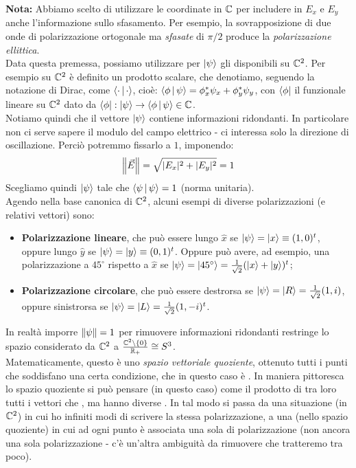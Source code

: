 \documentclass[FisicaTeorica.tex]{subfiles}
\begin{document}
\textbf{Nota:} Abbiamo scelto di utilizzare le coordinate in $\mathbb{C}$ per includere in $E_x$ e $E_y$ anche l'informazione sullo sfasamento. Per esempio, la sovrapposizione di due onde di polarizzazione ortogonale ma \textit{sfasate} di $\pi/2$ produce la \textit{polarizzazione ellittica}.\\
Data questa premessa, possiamo utilizzare per $\Ket{\psi}$ gli  disponibili su $\mathbb{C}^2$. Per esempio su $\mathbb{C}^2$ è definito un prodotto scalare, che denotiamo, seguendo la notazione di Dirac, come $\Braket{ \cdot |  \cdot }$, cioè: $\Braket{\phi|\psi} = \phi_x^* \psi_x + \phi_y^* \psi_y$, con $\Bra{\phi}$ il funzionale lineare su $\mathbb{C}^2$ dato da $\Bra{\phi}: \Ket{\psi} \to \Braket{\phi|\psi} \in \mathbb{C}$.\\
Notiamo quindi che il vettore $\Ket{\psi}$ contiene informazioni ridondanti. In particolare non ci serve sapere il modulo del campo elettrico - ci interessa solo la direzione di oscillazione. Perciò potremmo fissarlo a $1$, imponendo: 
\[
\left\lVert\vec{E}\right\rVert = \sqrt{|E_x|^2 + |E_y|^2} = 1
\]
Scegliamo quindi $\Ket{\psi}$ tale che $\Braket{\psi|\psi} = 1$ (norma unitaria).\\
Agendo nella base canonica di $\mathbb{C}^2$, alcuni esempi di diverse polarizzazioni (e relativi vettori) sono:
\begin{itemize}
    \item \textbf{Polarizzazione lineare}, che può essere lungo $\hat{x}$ se $\Ket\psi = \Ket{x} \equiv (1,0)^t$, oppure lungo $\hat{y}$ se $\Ket\psi = \Ket{y}\equiv (0,1)^t$. Oppure può avere, ad esempio, una polarizzazione a $45^\circ$ rispetto a $\hat{x}$ se $\Ket\psi = \Ket{45^\circ} = \frac{1}{\sqrt{2}}(\Ket{x}+\Ket{y})^t$;
    \item \textbf{Polarizzazione circolare}, che può essere destrorsa se $\Ket\psi = \Ket{R} = \frac{1}{\sqrt{2}}(1,i)$, oppure sinistrorsa se $\Ket\psi = \Ket{L} = \frac{1}{\sqrt{2}}(1,-i)^t$.
\end{itemize}
In realtà imporre $\left\lVert\psi\right\rVert = 1$ per rimuovere informazioni ridondanti restringe lo spazio considerato da $\mathbb{C}^2$ a $\frac{\mathbb{C}^2\setminus\{0\}}{\mathbb{R}_+} \cong S^3$.\\
Matematicamente, questo è uno \textit{spazio vettoriale quoziente}, ottenuto  tutti i punti che soddisfano una certa condizione, che in questo caso è . In maniera pittoresca lo spazio quoziente si può pensare (in questo caso) come il prodotto di  tra loro tutti i vettori che , ma hanno diverse . In tal modo si passa da una situazione (in $\mathbb{C}^2$) in cui ho infiniti modi di scrivere la stessa polarizzazione, a una (nello spazio quoziente) in cui ad ogni punto è associata una sola  di polarizzazione (non ancora una sola polarizzazione - c'è un'altra ambiguità da rimuovere che tratteremo tra poco).\\
\end{document}
